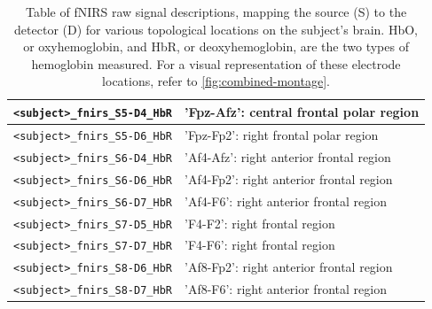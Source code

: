 \begin{table}
\begin{tabularx}{\textwidth}{|l|X|}
    \hline
    \texttt{<subject>\_fnirs\_S5-D4\_HbR} & 'Fpz-Afz': central frontal polar region  \\
    \hline
    \texttt{<subject>\_fnirs\_S5-D6\_HbR} & 'Fpz-Fp2': right frontal polar region  \\
    \hline
    \texttt{<subject>\_fnirs\_S6-D4\_HbR} & 'Af4-Afz': right anterior frontal region  \\
    \hline
    \texttt{<subject>\_fnirs\_S6-D6\_HbR} & 'Af4-Fp2': right anterior frontal region  \\
    \hline
    \texttt{<subject>\_fnirs\_S6-D7\_HbR} & 'Af4-F6': right anterior frontal region  \\
    \hline
    \texttt{<subject>\_fnirs\_S7-D5\_HbR} & 'F4-F2': right frontal region  \\
    \hline
    \texttt{<subject>\_fnirs\_S7-D7\_HbR} & 'F4-F6': right frontal region  \\
    \hline
    \texttt{<subject>\_fnirs\_S8-D6\_HbR} & 'Af8-Fp2': right anterior frontal region  \\
    \hline
    \texttt{<subject>\_fnirs\_S8-D7\_HbR} & 'Af8-F6': right anterior frontal region  \\
    \hline
    \end{tabularx}
    \caption{Table of fNIRS raw signal descriptions, mapping the source (S) to the detector (D) for various topological locations on the subject's brain. HbO, or oxyhemoglobin, and HbR, or deoxyhemoglobin, are the two types of hemoglobin measured. For a visual representation of these electrode locations, refer to \autoref{fig:combined-montage}.}
    \label{tab:fNIRS_signals}
    \end{table}
